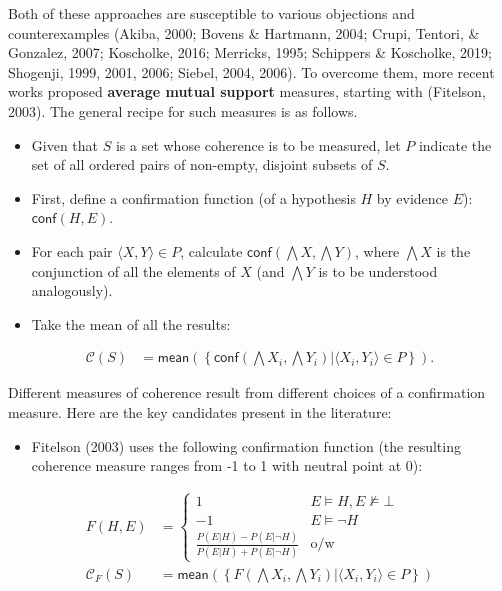 \documentclass[
  10pt,
]{scrartcl}
\providecommand{\tightlist}{%
  \setlength{\itemsep}{0pt}\setlength{\parskip}{0pt}}
\begin{document}
Both of these approaches are susceptible to various objections and counterexamples (Akiba, 2000; Bovens \& Hartmann, 2004; Crupi, Tentori, \& Gonzalez, 2007; Koscholke, 2016; Merricks, 1995; Schippers \& Koscholke, 2019; Shogenji, 1999, 2001, 2006; Siebel, 2004, 2006). To overcome them, more recent works proposed \textbf{average mutual support} measures, starting with (Fitelson, 2003). The general recipe for such measures is as follows.

\begin{itemize}
\item
  Given that \(S\) is a set whose coherence is to be measured, let \(P\)
  indicate the set of all ordered pairs of non-empty, disjoint subsets
  of \(S\).
\item
  First, define a confirmation function (of  a hypothesis \(H\) by evidence  \(E\)): \(\mathsf{conf}(H,E)\).
\item
  For each pair \(\langle X, Y \rangle \in P\), calculate
  \(\mathsf{conf}(\bigwedge X, \bigwedge Y)\), where $\bigwedge X$  is the conjunction of all the elements of $X$ (and $\bigwedge Y$ is to be understood analogously).
\item
  Take the mean of all the results:
\end{itemize}

\begin{align*}
    \mathcal{C}(S) & =
\mathsf{mean}\left(\left\{\mathsf{conf}(\bigwedge X_i, \bigwedge Y_i) | \langle X_i, Y_i \rangle \in P\right\} \right).
\end{align*}

\noindent Different measures of coherence result from different choices of a confirmation measure. Here are the key candidates present in the literature:

\begin{itemize}
\tightlist
\item
  Fitelson (2003) uses the following confirmation function (the resulting coherence measure ranges from -1 to 1 with neutral point at 0):
\end{itemize}

\begin{align}
    F(H,E) & = \begin{cases}
    1 & E\models H, E\not \models \bot \\
    -1 & E \models \neg H\\
    \frac{P(E|H)-P(E|\neg H)}{P(E|H)+P(E|\neg H)} & \mbox{o/w}
    \end{cases} \nonumber \\
\tag{Fitelson}  
    \mathcal{C}_{F}(S) & =
\mathsf{mean}\left(\left\{F(\bigwedge X_i, \bigwedge Y_i) | \langle X_i, Y_i\rangle \in P\right\} \right)
\end{align}
\end{document}
